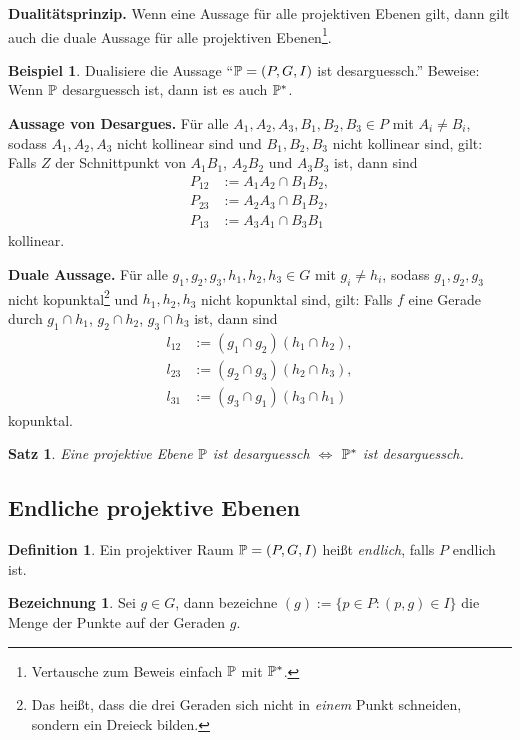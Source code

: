 \documentclass[
 a4paper,
 12pt,
 parskip=half
 ]{scrartcl}
\theoremstyle{plain}
\newtheorem{thm}{Satz}[section] %
\theoremstyle{definition}
\newtheorem*{exmp*}{Beispiel}
\newtheorem*{defn*}{Definition}
\newtheorem*{deno*}{Bezeichnung}
\begin{document}
\textbf{Dualitätsprinzip.} Wenn eine Aussage für alle projektiven Ebenen gilt, dann gilt auch die duale Aussage für alle projektiven Ebenen\footnote{Vertausche zum Beweis einfach $\mathbb{P}$ mit $\mathbb{P}^*$.}.

\begin{exmp*}
 Dualisiere die Aussage ``$\mathbb{P} = (P,G,I)$ ist desarguessch.'' Beweise: Wenn $\mathbb{P}$ desarguessch ist, dann ist es auch $\mathbb{P}^*$.
 
 \begin{addmargin}[.5cm]{0cm} 
 \textbf{Aussage von Desargues.} Für alle $A_1, A_2, A_3, B_1, B_2, B_3 \in P$ mit $A_i \ne B_i$, sodass $A_1, A_2, A_3$ nicht kollinear sind und $B_1, B_2, B_3$ nicht kollinear sind, gilt: Falls $Z$ der Schnittpunkt von $A_1 B_1$, $A_2 B_2$ und $A_3 B_3$ ist, dann sind 
 \begin{align*}
  P_{12} &:= A_1 A_2 \cap B_1 B_2, \\
  P_{23} &:= A_2 A_3 \cap B_1 B_2, \\
  P_{13} &:= A_3 A_1 \cap B_3 B_1 
 \end{align*}
 kollinear.
 
 \textbf{Duale Aussage.} Für alle $g_1, g_2, g_3, h_1, h_2, h_3 \in G$ mit $g_i \ne h_i$, sodass $g_1, g_2, g_3$ nicht kopunktal\footnote{Das heißt, dass die drei Geraden sich nicht in \emph{einem} Punkt schneiden, sondern ein Dreieck bilden.} und $h_1, h_2, h_3$ nicht kopunktal sind, gilt: Falls $f$ eine Gerade durch $g_1 \cap h_1$, $g_2 \cap h_2$, $g_3 \cap h_3$ ist, dann sind
 \begin{align*}
  l_{12} &:= (g_1 \cap g_2)(h_1 \cap h_2), \\
  l_{23} &:= (g_2 \cap g_3)(h_2 \cap h_3), \\
  l_{31} &:= (g_3 \cap g_1)(h_3 \cap h_1 )
 \end{align*}
 kopunktal.
 \end{addmargin}
\end{exmp*}

\begin{thm}
 Eine projektive Ebene $\mathbb{P}$ ist desarguessch $\Leftrightarrow$ $\mathbb{P}^*$ ist desarguessch.
\end{thm}

\subsection*{Endliche projektive Ebenen}
\begin{defn*}
 Ein projektiver Raum $\mathbb{P} = (P,G,I)$ heißt \emph{endlich}, falls $P$ endlich ist.
\end{defn*}

\begin{deno*}
 Sei $g \in G$, dann bezeichne $(g) := \{ p \in P : (p,g) \in I \}$ die Menge der Punkte auf der Geraden $g$.
\end{deno*}
\end{document}
